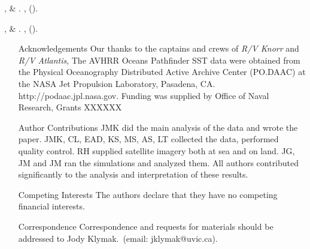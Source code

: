 \documentclass{article}
\begin{document}
\begin{thebibliography}{10}
,  \&
\newblock {}.
\newblock \emph{}
  \textbf{}, 
  ().

,  \&
\newblock {}.
\newblock \emph{}
  \textbf{}, 
  ().

\end{thebibliography}





\clearpage
\listoffigures
\clearpage

\begin{itemize}
 \item[Acknowledgements] Our thanks to the captains and crews of \emph{R/V Knorr} and \emph{R/V Atlantis}, The AVHRR Oceans Pathfinder SST data were obtained from the Physical Oceanography Distributed Active Archive Center (PO.DAAC) at the NASA Jet Propulsion Laboratory, Pasadena, CA. http://podaac.jpl.nasa.gov. Funding was supplied by Office of Naval Research, Grants XXXXXX
 \item[Author Contributions] JMK did the main analysis of the data and wrote the paper.  JMK, CL, EAD, KS, MS, AS, LT collected the data, performed quality control. RH supplied satellite imagery both at sea and on land. JG, JM and JM ran the simulations and analyzed them.  All authors contributed significantly to the analysis and interpretation of these results.  
 \item[Competing Interests] The authors declare that they have no competing financial interests.
 \item[Correspondence] Correspondence and requests for materials should be addressed to Jody Klymak.~(email: jklymak@uvic.ca).
\end{itemize}
\clearpage
\end{document}
